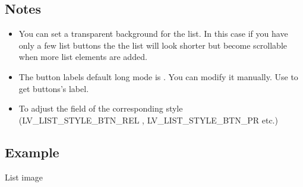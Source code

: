 \documentclass[letterpaper,10pt,english]{sphinxmanual}
\begin{document}
\subsection{Notes}
\label{\detokenize{object-types/list:notes}}\begin{itemize}
\item {} 
You can set a transparent background for the list. In this case if you have only a few list buttons the the list will look shorter but become scrollable when more list elements are added.

\item {} 
The button labels default long mode is . You can modify it manually. Use  to get buttons’s label.

\item {} 
To  adjust the  field of the corresponding style (LV\_LIST\_STYLE\_BTN\_REL , LV\_LIST\_STYLE\_BTN\_PR etc.)

\end{itemize}


\subsection{Example}
\label{\detokenize{object-types/list:example}}
List image
\end{document}
